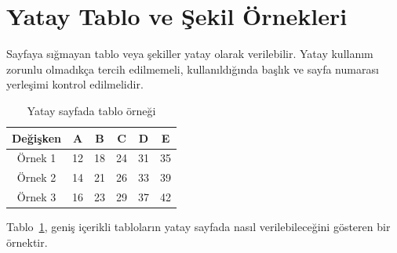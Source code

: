 \documentclass[12pt,a4paper]{report}
\begin{document}
\section{Yatay Tablo ve \c{S}ekil \"{O}rnekleri}

Sayfaya s\i{}\u{g}mayan tablo veya \c{s}ekiller yatay olarak verilebilir. Yatay kullan\i{}m zorunlu olmad\i{}k\c{c}a tercih edilmemeli, kullan\i{}ld\i{}\u{g}\i{}nda ba\c{s}l\i{}k ve sayfa numaras\i{} yerle\c{s}imi kontrol edilmelidir.

\begin{landscape}
\begin{table}[!ht]
\caption{Yatay sayfada tablo \"{o}rne\u{g}i}
\centering
\begin{tabular}{cccccc}
\hline\hline
De\u{g}i\c{s}ken & A & B & C & D & E \\
\hline
\"{O}rnek 1 & 12 & 18 & 24 & 31 & 35 \\
\"{O}rnek 2 & 14 & 21 & 26 & 33 & 39 \\
\"{O}rnek 3 & 16 & 23 & 29 & 37 & 42 \\
\hline
\end{tabular}
\label{table:landscape_table1}
\end{table}
\end{landscape}

Tablo~\ref{table:landscape_table1}, geni\c{s} i\c{c}erikli tablolar\i{}n yatay sayfada nas\i{}l verilebilece\u{g}ini g\"{o}steren bir \"{o}rnektir.
\end{document}
